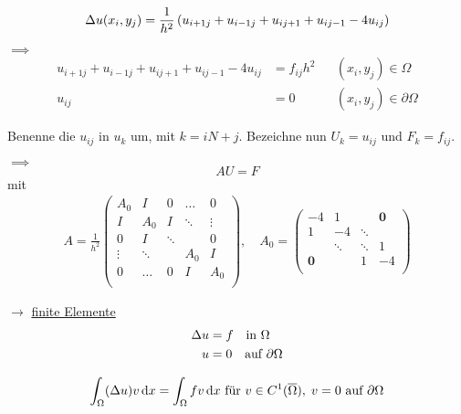 \begin{equation*}
	\Delta u(x_i,y_j) = \frac{1}{h^2} \left( u_{i+1 j} + u_{i-1 j} + u_{i j+1} + u_{i j-1} - 4u_{i j} \right)
\end{equation*}

$\implies$
\begin{align*}
	 u_{i+1 j} + u_{i-1 j} + u_{i j+1} + u_{i j-1} - 4u_{i j} &= f_{i j}h^2 & & (x_i,y_j) \in \Omega\\
	 u_{i j} &= 0 & & (x_i,y_j) \in \partial\Omega 
\end{align*}

Benenne die $u_{ij}$ in $u_k$ um, mit $k = iN+j$. Bezeichne nun $U_k = u_{ij}$ und $F_k = f_{ij} $.

$\implies$
\begin{equation*}
	AU = F 
\end{equation*}
mit 
\begin{align*}
	A = \frac{1}{h^2}
	\begin{pmatrix}
	A_0       & I        & 0		&\dots  & 0     \\
	I		  & A_0 	 & I 		&\ddots & \vdots\\
	0		  & I        & \ddots 	&		& 0     \\
	\vdots    & \ddots   & 		  	& A_0	&	I   \\
	0		  & \dots 	 & 0  		& I 	& A_0   \\
	\end{pmatrix}, 
	\quad
	A_0 = 
	\begin{pmatrix}
	-4    		& 1      & 		  & \textbf{0}  \\
	1	  		& -4 	 & \ddots & 			\\
		  		& \ddots & \ddots &	1   \\
	\textbf{0}	& 	     & 1 	  & -4   \\
	\end{pmatrix}
\end{align*}


$\rightarrow$ \underline{finite Elemente}
\begin{align*}
  \Delta u &= f \quad  \text{in}\  \Omega\\
  u &= 0 \quad \text{auf}\ \partial\Omega
\end{align*}

\begin{equation*}
	\int_\Omega (\Delta u) v \mathop{}\!\mathrm{d} x = \int_\Omega fv \mathop{}\!\mathrm{d} x \text { f\"ur } v\in C^1(\overline{\Omega}), \; v=0 \text{ auf } \partial \Omega
\end{equation*}

